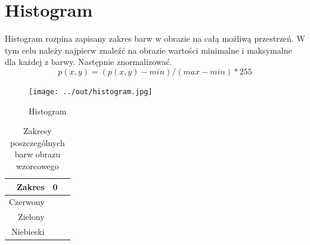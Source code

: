 \documentclass[a4paper,12pt]{article}
\begin{document}
\newpage
\section{Histogram}
Histogram rozpina zapisany zakres barw w obrazie na całą możliwą przestrzeń. W tym celu należy najpierw znaleźć na obrazie wartości minimalne i maksymalne dla każdej z barwy. Następnie znormalizować.
$$p(x, y) = (p(x, y) - min) / (max - min) * 255$$
\begin{figure}[h!]
   \centering
   \texttt{[image: ../out/histogram.jpg]}
   \caption{Histogram}
\end{figure}

\begin{table}[h!]
\centering
\begin{tabular}{|r|c|c|}
  \hline 
  Zakres & 0 &  \\
  \hline 
  Czerwony &  & \\
  \hline
  Zielony &  &  \\
  \hline
  Niebieski &  &  \\
  \hline
\end{tabular} 
\caption{Zakresy poszczególnych barw obrazu wzorcowego}
\end{table}


\newpage
\end{document}
